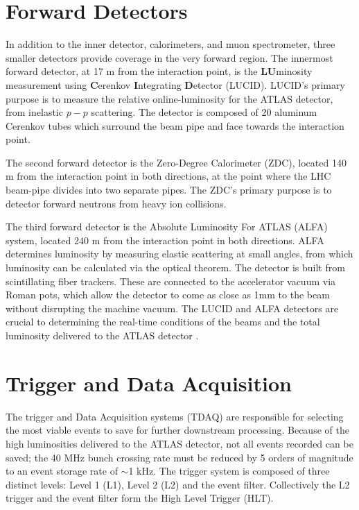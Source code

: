 \section{Forward Detectors}
	In addition to the inner detector, calorimeters, and muon spectrometer, three smaller detectors provide coverage in the very forward region. The innermost forward detector, at 17 m from the interaction point, is the \textbf{LU}minosity measurement using \textbf{C}erenkov \textbf{I}ntegrating \textbf{D}etector (LUCID). LUCID's primary purpose is to measure the relative online-luminosity for the ATLAS detector, from inelastic $p-p$ scattering. The detector is composed of 20 aluminum Cerenkov tubes which surround the beam pipe and face towards the interaction point. \par
	The second forward detector is the Zero-Degree Calorimeter (ZDC), located 140 m from the interaction point in both directions, at the point where the LHC beam-pipe divides into two separate pipes. The ZDC's primary purpose is to detector forward neutrons from heavy ion collisions. \par
	The third forward detector is the Absolute Luminosity For ATLAS (ALFA) system, located 240 m from the interaction point in both directions. ALFA determines luminosity by measuring elastic scattering at small angles, from which luminosity can be calculated via the optical theorem. The detector is built from scintillating fiber trackers. These are connected to the accelerator vacuum via Roman pots, which allow the detector to come as close as 1mm to the beam without disrupting the machine vacuum. The LUCID and ALFA detectors are crucial to determining the real-time conditions of the beams and the total luminosity delivered to the ATLAS detector  \cite{atlas_overview}.

\section{Trigger and Data Acquisition}
	The trigger and Data Acquisition systems (TDAQ) are responsible for selecting the most viable events to save for further downstream processing. Because of the high luminosities delivered to the ATLAS detector, not all events recorded can be saved; the 40 MHz bunch crossing rate must be reduced by 5 orders of magnitude to an event storage rate of $\sim$1 kHz. The trigger system is composed of three distinct levels: Level 1 (L1), Level 2 (L2) and the event filter. Collectively the L2 trigger and the event filter form the High Level Trigger (HLT).\par

